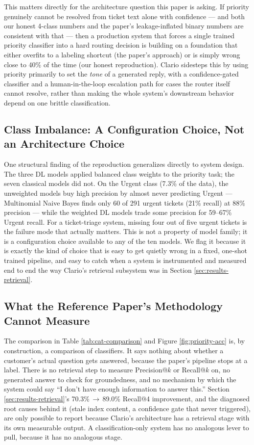 \documentclass[conference]{IEEEtran}
\begin{document}
This matters directly for the architecture question this paper is asking. If priority genuinely cannot be resolved from ticket text alone with confidence --- and both our honest 4-class numbers and the paper's leakage-inflated binary numbers are consistent with that --- then a production system that forces a single trained priority classifier into a hard routing decision is building on a foundation that either overfits to a labeling shortcut (the paper's approach) or is simply wrong close to 40\% of the time (our honest reproduction). Clario sidesteps this by using priority primarily to set the \emph{tone} of a generated reply, with a confidence-gated classifier and a human-in-the-loop escalation path for cases the router itself cannot resolve, rather than making the whole system's downstream behavior depend on one brittle classification.

\subsection{Class Imbalance: A Configuration Choice, Not an Architecture Choice}
One structural finding of the reproduction generalizes directly to system design. The three DL models applied balanced class weights to the priority task; the seven classical models did not. On the Urgent class (7.3\% of the data), the unweighted models buy high precision by almost never predicting Urgent --- Multinomial Naive Bayes finds only 60 of 291 urgent tickets (21\% recall) at 88\% precision --- while the weighted DL models trade some precision for 59--67\% Urgent recall. For a ticket-triage system, missing four out of five urgent tickets is the failure mode that actually matters. This is not a property of model family; it is a configuration choice available to any of the ten models. We flag it because it is exactly the kind of choice that is easy to get quietly wrong in a fixed, one-shot trained pipeline, and easy to catch when a system is instrumented and measured end to end the way Clario's retrieval subsystem was in Section \ref{sec:results-retrieval}.

\subsection{What the Reference Paper's Methodology Cannot Measure}
The comparison in Table \ref{tab:cat-comparison} and Figure \ref{fig:priority-acc} is, by construction, a comparison of classifiers. It says nothing about whether a customer's actual question gets answered, because the paper's pipeline stops at a label. There is no retrieval step to measure Precision@$k$ or Recall@$k$ on, no generated answer to check for groundedness, and no mechanism by which the system could say ``I don't have enough information to answer this.'' Section \ref{sec:results-retrieval}'s 70.3\%\,$\rightarrow$\,89.0\% Recall@4 improvement, and the diagnosed root causes behind it (stale index content, a confidence gate that never triggered), are only possible to report because Clario's architecture has a retrieval stage with its own measurable output. A classification-only system has no analogous lever to pull, because it has no analogous stage.
\end{document}
